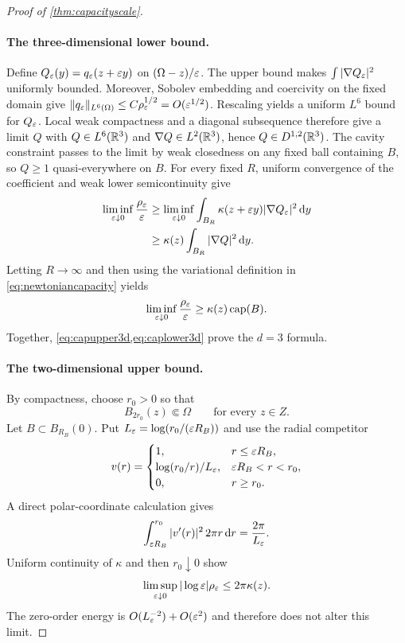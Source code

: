\begin{proof}[Proof of \cref{thm:capacityscale}]
\paragraph{The three-dimensional lower bound.}
Define $Q_\varepsilon(y)=q_\varepsilon(z+\varepsilon y)$ on
$(\Omega-z)/\varepsilon$. The upper bound makes $\int|\nabla Q_\varepsilon|^2$ uniformly bounded. Moreover, Sobolev embedding and coercivity on the fixed domain give $\|q_\varepsilon\|_{L^6(\Omega)}\le C\rho_\varepsilon^{1/2}=O(\varepsilon^{1/2})$. Rescaling yields a uniform $L^6$ bound for $Q_\varepsilon$. Local weak compactness and a diagonal subsequence therefore give a limit $Q$ with $Q\in L^6(\mathbb{R}^3)$ and $\nabla Q\in L^2(\mathbb{R}^3)$, hence $Q\in D^{1,2}(\mathbb{R}^3)$. The cavity constraint passes to the limit by weak closedness on any fixed ball containing $B$, so $Q\ge1$ quasi-everywhere on $B$.  For every fixed $R$,
uniform convergence of the coefficient and weak lower semicontinuity give
\begin{align}
 \liminf_{\varepsilon\downarrow0}\frac{\rho_\varepsilon}{\varepsilon}
 &\ge\liminf_{\varepsilon\downarrow0}
 \int_{B_R}\kappa(z+\varepsilon y)|\nabla Q_\varepsilon|^2\,\mathrm dy\\
 &\ge\kappa(z)\int_{B_R}|\nabla Q|^2\,\mathrm dy.
\end{align}
Letting $R\to\infty$ and then using the variational definition in
\cref{eq:newtoniancapacity} yields
\begin{equation}
 \liminf_{\varepsilon\downarrow0}\frac{\rho_\varepsilon}{\varepsilon}
 \ge\kappa(z)\operatorname{cap}(B).
 \label{eq:caplower3d}
\end{equation}
Together, \cref{eq:capupper3d,eq:caplower3d} prove the $d=3$ formula.

\paragraph{The two-dimensional upper bound.}
By compactness, choose $r_0>0$ so that
\begin{equation}
 B_{2r_0}(z)\Subset\Omega\qquad\text{for every }z\in Z.
\end{equation}
Let $B\subset B_{R_B}(0)$.  Put
$L_\varepsilon=\log(r_0/(\varepsilon R_B))$ and use the radial competitor
\begin{equation}
 v(r)=
 \begin{cases}
 1,&r\le\varepsilon R_B,\\
 \log(r_0/r)/L_\varepsilon,&\varepsilon R_B<r<r_0,\\
 0,&r\ge r_0.
 \end{cases}
\end{equation}
A direct polar-coordinate calculation gives
\begin{equation}
 \int_{\varepsilon R_B}^{r_0}|v'(r)|^2\,2\pi r\,\mathrm dr
 =\frac{2\pi}{L_\varepsilon}.
 \label{eq:annulusenergy}
\end{equation}
Uniform continuity of $\kappa$ and then $r_0\downarrow0$ show
\begin{equation}
 \limsup_{\varepsilon\downarrow0}
 |\log\varepsilon|\rho_\varepsilon\le2\pi\kappa(z).
 \label{eq:capupper2d}
\end{equation}
The zero-order energy is $O(L_\varepsilon^{-2})+O(\varepsilon^2)$ and therefore does not
alter this limit.


\end{proof}
